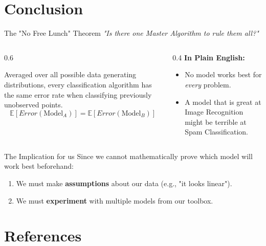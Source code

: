 \section{Conclusion}
\begin{frame}{The "No Free Lunch" Theorem}
    \centering
    \textit{"Is there one Master Algorithm to rule them all?"}
    \normalsize
    
    \begin{columns}[c]
        \begin{column}{0.6\textwidth}
            \begin{tcolorbox}[colback=yellow!10, colframe=orange!80!black, title=\textbf{The Theorem (Wolpert, 1996)}]
                Averaged over all possible data generating distributions, every classification algorithm has the same error rate when classifying previously unobserved points.
                \vspace{-1mm}
                $$ \mathbb{E}[Error(\text{Model}_A)] = \mathbb{E}[Error(\text{Model}_B)] $$
            \end{tcolorbox}
        \end{column}
        \begin{column}{0.4\textwidth}
            \centering
            \textbf{In Plain English:}
            \vspace{0.5em}
            \begin{itemize}
                \item No model works best for \textit{every} problem.
                \item A model that is great at Image Recognition might be terrible at Spam Classification.
            \end{itemize}
        \end{column}
    \end{columns}

    \begin{alertblock}{The Implication for us}
        Since we cannot mathematically prove which model will work best beforehand:
        \begin{enumerate}
            \item We must make \textbf{assumptions} about our data (e.g., "it looks linear").
            \item We must \textbf{experiment} with multiple models from our toolbox.
        \end{enumerate}
    \end{alertblock}
\end{frame}

\section{References}
